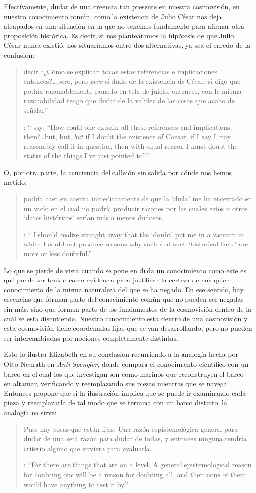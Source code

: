 Efectívamente, dudar de una creencia tan presente en nuestra cosmovisión, en nuestro conocimiento común, como la existencia de Julio César nos deja atrapados en una situación en la que no tenemos fundamento para afirmar otra proposición histórica. Es decir, si nos planteáramos la hipótesis de que Julio César nunca existió, nos situaríamos entre dos alternativas, ya sea el enredo de la confusión: \blockquote[{\cite[91]{anscombe1981parmenides:humeandjulius}}: \enquote{\textelp{} say: ``How could one explain all these references and implications, then?\ldots but, but, \emph{but} if I doubt the existence of Caesar, if I say I may reasonably call it in question, then with equal reason I must doubt the status of the things I've just pointed to''}]{\textelp{} decir ``¿Cómo se explican todas estas referencias e implicaciones entonces?\ldots pero, pero \emph{pero} si dudo de la existencia de César, si digo que podría razonablemente ponerlo en tela de juicio, entonces, con la misma razonabilidad tengo que dudar de la validez de las cosas que acabo de señalar''}. O, por otra parte, la conciencia del callejón sin salida por dónde nos hemos metido: \blockquote[{\cite[91]{anscombe1981parmenides:humeandjulius}}: \enquote{\textelp{} I should realize straight away that the `doubt' put me in a vacuum in which I could not produce reasons why such and such `historical facts' are more or less doubtful.}]{\textelp{} podría caer en cuenta inmediatamente de que la `duda' me ha encerrado en un vacío en el cual no podría producir razones por las cuales estos u otros `datos históricos' serían más o menos dudosos.}

Lo que se pierde de vista cuando se pone en duda un conocimiento como este es qué puede ser tenido como evidencia para justificar la certeza de cualquier conocimiento de la misma naturaleza del que se ha negado. En ese sentido, hay creencias que forman parte del conocimiento común que no pueden ser negadas sin más, sino que forman parte de los fundamentos de la cosmovisión dentro de la cuál se está discutiendo. Nuestro conocimiento está dentro de una cosmovisión y esta cosmovisión tiene coordenadas fijas que se van desarrollando, pero no pueden ser intercambiadas por nociones completamente distintas.

Esto lo ilustra Elizabeth en su conclusíon recurriendo a la analogía hecha por Otto Neurath en \emph{Anti-Spengler}, donde compara el conocimiento científico con un barco en el cual los que investigan son como marinos que reconstruyen el barco en altamar, verificando y reemplazando sus piezas mientras que se navega. Entonces propone que si la ilustración implica que se puede ir examinando cada pieza y reemplazarla de tal modo que se termina con un barco distinto, la analogía no sirve: \blockquote[{\cite[92]{anscombe1981parmenides:humeandjulius}}: \enquote{For there are things that are on a level. A general epistemological reason for doubting one will be a reason for doubting all, and then none of them would have anything to test it by.}]{Pues hay cosas que están fijas. Una razón espistemológica general para dudar de una será razón para dudar de todas, y entonces ninguna tendría criterio alguno que sirviera para evaluarla.}
